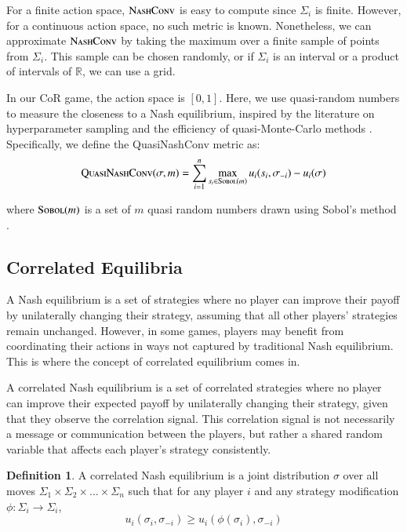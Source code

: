 \documentclass[preprint,12pt,authoryear,doubleblind]{elsarticle}
\theoremstyle{definition}
\newtheorem{definition}{Definition}[section]
\begin{document}
For a finite action space, $\textsc{NashConv}$ is easy to compute since $\Sigma_i$ is finite. However, for a continuous action space, no such metric is known. Nonetheless, we can approximate $\textsc{NashConv}$ by taking the maximum over a finite sample of points from $\Sigma_i$. This sample can be chosen randomly, or if $\Sigma_i$ is an interval or a product of intervals of $\mathbb{R}$, we can use a grid. 

In our CoR game, the action space is $[0,1]$. Here, we use quasi-random numbers to measure the closeness to a Nash equilibrium, inspired by the literature on hyperparameter sampling \citep{Bousquet2017-kg} and the efficiency of quasi-Monte-Carlo methods \citep{sobol1990quasi}. Specifically, we define the QuasiNashConv metric as: 
$$\textsc{QuasiNashConv}(\sigma, m) = \sum_{i=1}^n \max_{s_i \in \textsc{Sobol}(m)} u_i(s_i, \sigma_{-i}) - u_i(\sigma)$$

where $\textsc{Sobol}(m)$ is a set of $m$ quasi random numbers drawn using Sobol’s method \citep{sobol1967distribution}.

\subsection{Correlated Equilibria}

A Nash equilibrium is a set of strategies where no player can improve their payoff by unilaterally changing their strategy, assuming that all other players' strategies remain unchanged. However, in some games, players may benefit from coordinating their actions in ways not captured by traditional Nash equilibrium. This is where the concept of correlated equilibrium comes in.

A correlated Nash equilibrium is a set of correlated strategies where no player can improve their expected payoff by unilaterally changing their strategy, given that they observe the correlation signal. This correlation signal is not necessarily a message or communication between the players, but rather a shared random variable that affects each player's strategy consistently.

\begin{definition}
\label{def:cor}
A correlated Nash equilibrium is a joint distribution $\sigma$ over all moves $\Sigma_1 \times \Sigma_2 \times \ldots \times \Sigma_n$ such that for any player $i$ and any strategy modification $\phi: \Sigma_i \rightarrow \Sigma_i$, $$u_i(\sigma_i, \sigma_{-i}) \ge u_i(\phi(\sigma_i), \sigma_{-i})$$
\end{definition}
\end{document}
